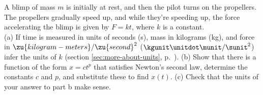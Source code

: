 A blimp of mass $m$ is initially at rest, and then
the pilot turns on the propellers. The propellers gradually
speed up, and while they're speeding up, the force accelerating
the blimp is given by $F=kt$, where $k$ is a constant.\\
(a) If time is measured in units of seconds (s), mass in kilograms (kg), 
and force in $\zu{kilogram-meters}/\zu{second}^2$ ($\kgunit\unitdot\munit/\sunit^2$) infer the units of $k$
(section \ref{sec:more-about-units}, p.~\pageref{sec:more-about-units}).\hwendpart
%
(b)
Show that there is a function of the form $x=ct^p$ that
satisfies Newton's second law, determine the constants
$c$ and $p$, and substitute these to find $x(t)$.\hwendpart
%
(c)
Check that the units of your answer to part b make sense.
\answercheck
